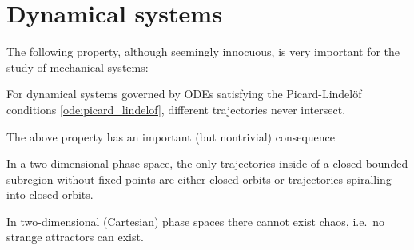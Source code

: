 \section{Dynamical systems}

    The following property, although seemingly innocuous, is very important for the study of mechanical systems:
    \begin{property}
        For dynamical systems governed by ODEs satisfying the Picard-Lindel\"of conditions \ref{ode:picard_lindelof}, different trajectories never intersect.
    \end{property}

    The above property has an important (but nontrivial) consequence
    \begin{theorem}
        In a two-dimensional phase space, the only trajectories inside of a closed bounded subregion without fixed points are either closed orbits or trajectories spiralling into closed orbits.
    \end{theorem}
    \begin{result}
        In two-dimensional (Cartesian) phase spaces there cannot exist chaos, i.e.~no strange attractors can exist.
    \end{result}



